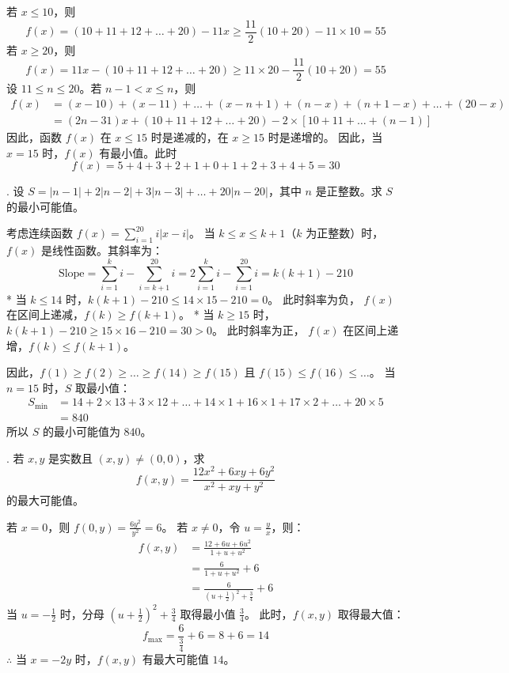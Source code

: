 \begin{questions}
\begin{solution}
若 $x \le 10$，则
\[
f(x) = (10 + 11 + 12 + \dots + 20) - 11x \ge \frac{11}{2}(10 + 20) - 11 \times 10 = 55
\]
若 $x \ge 20$，则
\[
f(x) = 11x - (10 + 11 + 12 + \dots + 20) \ge 11 \times 20 - \frac{11}{2}(10 + 20) = 55
\]
设 $11 \le n \le 20$。若 $n - 1 < x \le n$，则
\begin{align*}
f(x) &= (x - 10) + (x - 11) + \dots + (x - n + 1) + (n - x) + (n + 1 - x) + \dots + (20 - x) \\
&= (2n - 31)x + (10 + 11 + 12 + \dots + 20) - 2 \times [10 + 11 + \dots + (n - 1)]
\end{align*}
因此，函数 $f(x)$ 在 $x \le 15$ 时是递减的，在 $x \ge 15$ 时是递增的。
因此，当 $x = 15$ 时，$f(x)$ 有最小值。此时
\[
f(x) = 5 + 4 + 3 + 2 + 1 + 0 + 1 + 2 + 3 + 4 + 5 = 30
\]
\end{solution}
    . 设 $S = |n-1| + 2|n-2| + 3|n-3| + \dots + 20|n-20|$，其中 $n$ 是正整数。求 $S$ 的最小可能值。

\begin{solution}
考虑连续函数 $f(x) = \sum_{i=1}^{20} i|x-i|$。
当 $k \le x \le k+1$（$k$ 为正整数）时，$f(x)$ 是线性函数。其斜率为：
\[
\text{Slope} = \sum_{i=1}^{k} i - \sum_{i=k+1}^{20} i = 2\sum_{i=1}^{k} i - \sum_{i=1}^{20} i = k(k+1) - 210
\]
* 当 $k \le 14$ 时，$k(k+1) - 210 \le 14 \times 15 - 210 = 0$。
    此时斜率为负， $f(x)$ 在区间上递减，$f(k) \ge f(k+1)$。
* 当 $k \ge 15$ 时，$k(k+1) - 210 \ge 15 \times 16 - 210 = 30 > 0$。
    此时斜率为正， $f(x)$ 在区间上递增，$f(k) \le f(k+1)$。

因此，$f(1) \ge f(2) \ge \dots \ge f(14) \ge f(15)$ 且 $f(15) \le f(16) \le \dots$。
当 $n=15$ 时，$S$ 取最小值：
\begin{align*}
S_{\min} &= 14 + 2 \times 13 + 3 \times 12 + \dots + 14 \times 1 + 16 \times 1 + 17 \times 2 + \dots + 20 \times 5 \\
&= 840
\end{align*}
所以 $S$ 的最小可能值为 $840$。
\end{solution}

. 若 $x, y$ 是实数且 $(x, y) \neq (0, 0)$，求
\[
f(x, y) = \frac{12x^2 + 6xy + 6y^2}{x^2 + xy + y^2}
\]
的最大可能值。

\begin{solution}
若 $x=0$，则 $f(0, y) = \frac{6y^2}{y^2} = 6$。
若 $x \neq 0$，令 $u = \frac{y}{x}$，则：
\begin{align*}
f(x, y) &= \frac{12 + 6u + 6u^2}{1 + u + u^2} \\
&= \frac{6}{1 + u + u^2} + 6 \\
&= \frac{6}{\left( u + \frac{1}{2} \right)^2 + \frac{3}{4}} + 6
\end{align*}
当 $u = -\frac{1}{2}$ 时，分母 $\left( u + \frac{1}{2} \right)^2 + \frac{3}{4}$ 取得最小值 $\frac{3}{4}$。
此时，$f(x, y)$ 取得最大值：
\[
f_{\max} = \frac{6}{\frac{3}{4}} + 6 = 8 + 6 = 14
\]
$\therefore$ 当 $x = -2y$ 时，$f(x, y)$ 有最大可能值 $14$。
\end{solution}


\end{questions}
